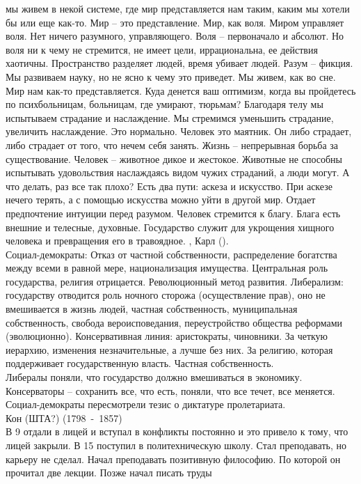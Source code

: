 \documentclass[a4paper,12pt]{report} %
\begin{document}
\begin{itemize}
мы живем в некой системе, где мир представляется нам таким, каким мы
хотели бы или еще как-то. Мир -- это представление. Мир, как
воля. Миром управляет воля. Нет ничего разумного, управляющего. Воля
-- первоначало и абсолют. Но воля ни к чему не стремится, не имеет
цели, иррациональна, ее действия хаотичны. Пространство разделяет
людей, время убивает людей. Разум -- фикция. Мы развиваем науку, но не
ясно к чему это приведет. Мы живем, как во сне. Мир нам как-то
представляется. Куда денется ваш оптимизм, когда вы пройдетесь по
психбольницам, больницам, где умирают, тюрьмам? Благодаря телу мы
испытываем страдание и наслаждение. Мы стремимся уменьшить страдание,
увеличить наслаждение. Это нормально. Человек это маятник. Он либо
страдает, либо страдает от того, что нечем себя занять. Жизнь --
непрерывная борьба за существование. Человек -- животное дикое и
жестокое. Животные не способны испытывать удовольствия наслаждаясь
видом чужих страданий, а люди могут. А что делать, раз все так плохо?
Есть два пути: аскеза и искусство. При аскезе нечего терять, а с
помощью искусства можно уйти в другой мир. Отдает предпочтение
интуиции перед разумом. Человек стремится к благу. Блага есть внешние
и телесные, духовные. Государство служит для
укрощения хищного человека и превращения его в травоядное.
, Карл ().\\
Социал-демократы: Отказ от частной собственности, распределение богатства между всеми в
равной мере, национализация имущества. Центральная роль государства,
религия отрицается. Революционный метод развития.
Либерализм: государству отводится роль ночного сторожа (осуществление
прав), оно не вмешивается в жизнь людей, частная собственность,
муниципальная собственность, свобода вероисповедания, переустройство
общества реформами (эволюционно).
Консервативная линия: аристократы, чиновники. За четкую иерархию,
изменения незначительные, а лучше без них. За религию, которая
поддерживает государственную власть. Частная собственность.
\\
Либералы поняли, что государство должно вмешиваться в
экономику. Консерваторы -- сохранить все, что есть, поняли, что все
течет, все меняется. Социал-демократы пересмотрели тезис о диктатуре
пролетариата.
\\
 Кон (ШТА?) (1798~-~1857)\\
В 9 отдали в лицей и вступал в конфликты постоянно и это привело к
тому, что лицей закрыли. В 15 поступил в политехническую школу. Стал
преподавать, но карьеру не сделал. Начал преподавать позитивную
философию. По которой он прочитал две лекции. Позже начал писать труды

\end{itemize}
\end{document}

